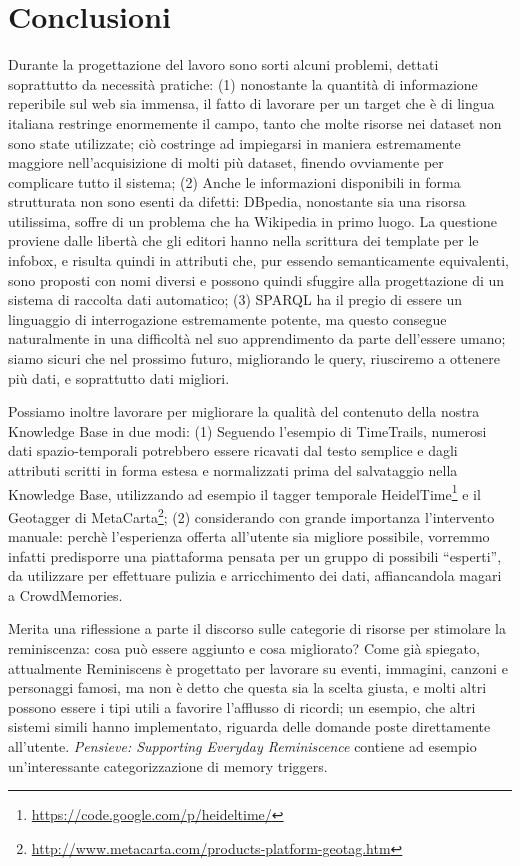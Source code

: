 \documentclass[sigproc-sp.tex]{subfiles}
\begin{document}
\section{Conclusioni}
Durante la progettazione del lavoro sono sorti alcuni problemi, dettati soprattutto da necessità pratiche: (1) nonostante la quantità di informazione reperibile sul web sia immensa, il fatto di lavorare per un target che è di lingua italiana restringe enormemente il campo, tanto che molte risorse nei dataset non sono state utilizzate; ciò costringe ad impiegarsi in maniera estremamente maggiore nell’acquisizione di molti più dataset, finendo ovviamente per complicare tutto il sistema; (2) Anche le informazioni disponibili in forma strutturata non sono esenti da difetti: DBpedia, nonostante sia una risorsa utilissima, soffre di un problema che ha Wikipedia in primo luogo. La questione proviene dalle libertà che gli editori hanno nella scrittura dei template per le infobox, e risulta quindi in attributi che, pur essendo semanticamente equivalenti, sono proposti con nomi diversi e possono quindi sfuggire alla progettazione di un sistema di raccolta dati automatico; (3) SPARQL ha il pregio di essere un linguaggio di interrogazione estremamente potente, ma questo consegue naturalmente in una difficoltà nel suo apprendimento da parte dell'essere umano; siamo sicuri che nel prossimo futuro, migliorando le query, riusciremo a ottenere più dati, e soprattutto dati migliori. 

Possiamo inoltre lavorare per migliorare la qualità del contenuto della nostra Knowledge Base in due modi: (1) Seguendo l’esempio di TimeTrails, numerosi dati spazio-temporali potrebbero essere ricavati dal testo semplice e dagli attributi scritti in forma estesa e normalizzati prima del salvataggio nella Knowledge Base, utilizzando ad esempio il tagger temporale HeidelTime\footnote{\url{https://code.google.com/p/heideltime/}} e il Geotagger di MetaCarta\footnote{\url{http://www.metacarta.com/products-platform-geotag.htm}}; (2) considerando con grande importanza l'intervento manuale: perchè l’esperienza offerta all’utente sia migliore possibile, vorremmo infatti predisporre una piattaforma pensata per un gruppo di possibili “esperti”, da utilizzare per effettuare pulizia e arricchimento dei dati, affiancandola magari a CrowdMemories.

Merita una riflessione a parte il discorso sulle categorie di risorse per stimolare la reminiscenza: cosa può essere aggiunto e cosa migliorato? Come già spiegato, attualmente Reminiscens è progettato per lavorare su eventi, immagini, canzoni e personaggi famosi, ma non è detto che questa sia la scelta giusta, e molti altri possono essere i tipi utili a favorire l'afflusso di ricordi; un esempio, che altri sistemi simili hanno implementato, riguarda delle domande poste direttamente all'utente. \textit{Pensieve: Supporting Everyday Reminiscence} contiene ad esempio un'interessante categorizzazione di memory triggers\cite{peesapati2010pensieve}.
\end{document}
